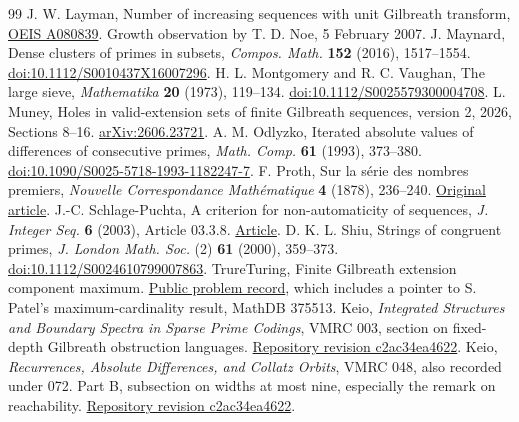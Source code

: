 \documentclass[11pt,a4paper]{article}
\begin{document}
\begin{thebibliography}{99}
 J. W. Layman, Number of increasing sequences with unit Gilbreath transform, \href{https://oeis.org/A080839}{OEIS A080839}. Growth observation by T. D. Noe, 5 February 2007.
 J. Maynard, Dense clusters of primes in subsets, \emph{Compos. Math.} \textbf{152} (2016), 1517--1554. \href{https://doi.org/10.1112/S0010437X16007296}{doi:10.1112/S0010437X16007296}.
 H. L. Montgomery and R. C. Vaughan, The large sieve, \emph{Mathematika} \textbf{20} (1973), 119--134. \href{https://doi.org/10.1112/S0025579300004708}{doi:10.1112/S0025579300004708}.
 L. Muney, Holes in valid-extension sets of finite Gilbreath sequences, version 2, 2026, Sections 8--16. \href{https://arxiv.org/abs/2606.23721}{arXiv:2606.23721}.
 A. M. Odlyzko, Iterated absolute values of differences of consecutive primes, \emph{Math. Comp.} \textbf{61} (1993), 373--380. \href{https://doi.org/10.1090/S0025-5718-1993-1182247-7}{doi:10.1090/S0025-5718-1993-1182247-7}.
 F. Proth, Sur la série des nombres premiers, \emph{Nouvelle Correspondance Mathématique} \textbf{4} (1878), 236--240. \href{https://gdz.sub.uni-goettingen.de/download/pdf/PPN598948236_0004/LOG_0088.pdf}{Original article}.
 J.-C. Schlage-Puchta, A criterion for non-automaticity of sequences, \emph{J. Integer Seq.} \textbf{6} (2003), Article 03.3.8. \href{https://cs.uwaterloo.ca/journals/JIS/VOL6/Puchta/puchta70.pdf}{Article}.
 D. K. L. Shiu, Strings of congruent primes, \emph{J. London Math. Soc.} (2) \textbf{61} (2000), 359--373. \href{https://doi.org/10.1112/S0024610799007863}{doi:10.1112/S0024610799007863}.
 TrureTuring, Finite Gilbreath extension component maximum. \href{https://www.trureturing.org/research/muney-gilbreath-component-maximum/}{Public problem record}, which includes a pointer to S. Patel's maximum-cardinality result, MathDB 375513.
 Keio, \emph{Integrated Structures and Boundary Spectra in Sparse Prime Codings}, VMRC 003, section on fixed-depth Gilbreath obstruction languages. \href{https://github.com/QEEDDD/Verifiable-Mathematical-Reasoning-Corpus/tree/c2ac34ea4622778187173f41bb1996deee8081b7}{Repository revision c2ac34ea4622}.
 Keio, \emph{Recurrences, Absolute Differences, and Collatz Orbits}, VMRC 048, also recorded under 072. Part B, subsection on widths at most nine, especially the remark on reachability. \href{https://github.com/QEEDDD/Verifiable-Mathematical-Reasoning-Corpus/tree/c2ac34ea4622778187173f41bb1996deee8081b7}{Repository revision c2ac34ea4622}.
\end{thebibliography}
\end{document}
